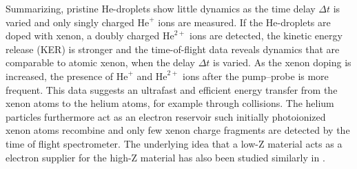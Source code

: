 Summarizing, pristine He-droplets show little dynamics as the time delay $\Delta t$ is varied and only singly charged $\text{He}^{+}$ ions are measured. If the He-droplets are doped with xenon, a doubly charged $\text{He}^{2+}$ ions are detected, the kinetic energy release (KER) is stronger and the time-of-flight data reveals dynamics that are comparable to atomic xenon, when the delay $\Delta t$ is varied. As the xenon doping is increased, the presence of $\text{He}^{+}$ and $\text{He}^{2+}$ ions after the pump--probe is more frequent. This data suggests an ultrafast and efficient energy transfer from the xenon atoms to the helium atoms, for example through collisions. The helium particles furthermore act as an electron reservoir such initially photoionized xenon atoms recombine and only few xenon charge fragments are detected by the time of flight spectrometer. The underlying idea that a low-Z material acts as a electron supplier for the high-Z material has also been studied similarly in \citep{Hoener-2008-JPB}.
%
%
%
